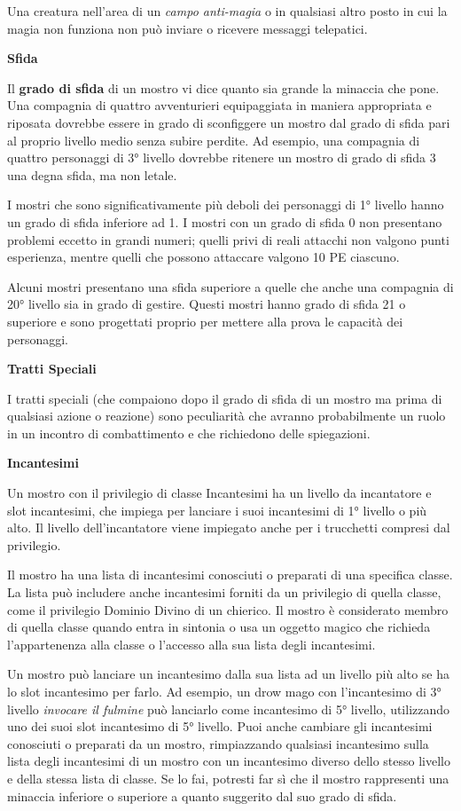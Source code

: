 \begin{multicols}{2}
Una creatura nell'area di un \emph{campo anti-magia} o in qualsiasi
altro posto in cui la magia non funziona non può inviare o ricevere
messaggi telepatici.

\textbf{Sfida}

Il \textbf{grado di sfida} di un mostro vi dice quanto sia grande la
minaccia che pone. Una compagnia di quattro avventurieri equipaggiata in
maniera appropriata e riposata dovrebbe essere in grado di sconfiggere
un mostro dal grado di sfida pari al proprio livello medio senza subire
perdite. Ad esempio, una compagnia di quattro personaggi di 3° livello
dovrebbe ritenere un mostro di grado di sfida 3 una degna sfida, ma non
letale.

I mostri che sono significativamente più deboli dei personaggi di 1°
livello hanno un grado di sfida inferiore ad 1. I mostri con un grado di
sfida 0 non presentano problemi eccetto in grandi numeri; quelli privi
di reali attacchi non valgono punti esperienza, mentre quelli che
possono attaccare valgono 10 PE ciascuno.

Alcuni mostri presentano una sfida superiore a quelle che anche una
compagnia di 20° livello sia in grado di gestire. Questi mostri hanno
grado di sfida 21 o superiore e sono progettati proprio per mettere alla
prova le capacità dei personaggi.

\textbf{Tratti Speciali}

I tratti speciali (che compaiono dopo il grado di sfida di un mostro ma
prima di qualsiasi azione o reazione) sono peculiarità che avranno
probabilmente un ruolo in un incontro di combattimento e che richiedono
delle spiegazioni.

\textbf{Incantesimi}

Un mostro con il privilegio di classe Incantesimi ha un livello da
incantatore e slot incantesimi, che impiega per lanciare i suoi
incantesimi di 1° livello o più alto. Il livello dell'incantatore viene
impiegato anche per i trucchetti compresi dal privilegio.

Il mostro ha una lista di incantesimi conosciuti o preparati di una
specifica classe. La lista può includere anche incantesimi forniti da un
privilegio di quella classe, come il privilegio Dominio Divino di un
chierico. Il mostro è considerato membro di quella classe quando entra
in sintonia o usa un oggetto magico che richieda l'appartenenza alla
classe o l'accesso alla sua lista degli incantesimi.

Un mostro può lanciare un incantesimo dalla sua lista ad un livello più
alto se ha lo slot incantesimo per farlo. Ad esempio, un drow mago con
l'incantesimo di 3° livello \emph{invocare il fulmine} può lanciarlo
come incantesimo di 5° livello, utilizzando uno dei suoi slot
incantesimo di 5° livello. Puoi anche cambiare gli incantesimi
conosciuti o preparati da un mostro, rimpiazzando qualsiasi incantesimo
sulla lista degli incantesimi di un mostro con un incantesimo diverso
dello stesso livello e della stessa lista di classe. Se lo fai, potresti
far sì che il mostro rappresenti una minaccia inferiore o superiore a
quanto suggerito dal suo grado di sfida.


\end{multicols}
